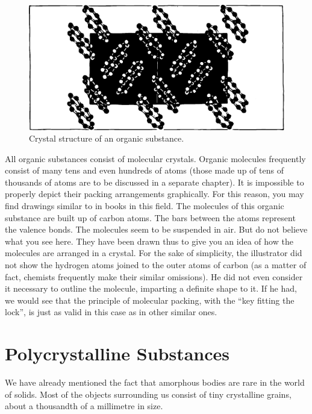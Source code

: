 \begin{figure}[!ht]
\centering
\includegraphics[width=\textwidth]{figures/fig-02-21.pdf}
\caption{Crystal structure of an organic substance.}
\label{fig-2.21}
\end{figure}

All organic substances consist of molecular crystals. Organic molecules frequently consist of many tens and even hundreds of atoms (those made up of tens of thousands of atoms are to be discussed in a separate chapter). It is impossible to properly depict their packing arrangements graphically. For this reason, you may find drawings similar to  in books in this field. The mole­cules of this organic substance are built up of carbon atoms. The bars between the atoms represent the valence bonds. The molecules seem to be suspended in air. But do not believe what you see here. They have been drawn thus to give you an idea of how the molecules are arranged in a crystal. For the sake of simplicity, the illustrator did not show the hydrogen atoms joined to the outer atoms of carbon (as a matter of fact, chemists frequently make their similar omissions). He did not even consider it necessary to outline the molecule, imparting a definite shape to it. If he had, we would see that the principle of molecular packing, with the ``key fitting the lock'', is just as valid in this case as in other similar ones.



\section{Polycrystalline Substances}

We have already mentioned the fact that amorphous bodies are rare in the world of solids. Most of the objects surrounding us consist of tiny crystalline grains, about a thousandth of a millimetre in size.

